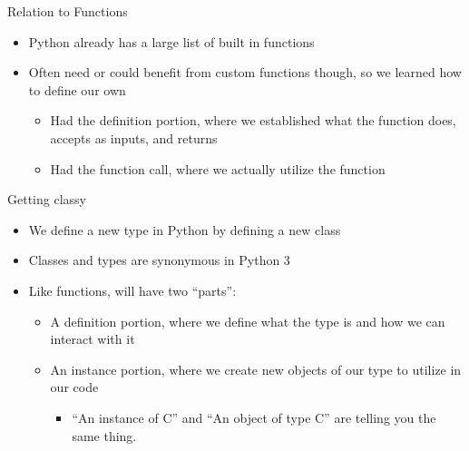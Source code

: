 \documentclass[pdf, aspectratio=169, 12pt]{beamer}
\begin{document}
\begin{frame}{Relation to Functions}
	\begin{itemize}
		\item Python already has a large list of built in functions
		\item Often need or could benefit from custom functions though, so we learned how to define our own
			\begin{itemize}
				\item Had the definition portion, where we established what the function does, accepts as inputs, and returns
				\item Had the function call, where we actually utilize the function
			\end{itemize}
	\end{itemize}
	\vspace{5mm}
	\begin{center}
	\end{center}
\end{frame}

\begin{frame}{Getting classy}
	\begin{itemize}
		\item We define a new \alert{type} in Python by defining a new \alert{class}
		\item Classes and types are synonymous in Python 3
		\item Like functions, will have two ``parts'':
			\begin{itemize}
				\item A definition portion, where we define what the type is and how we can interact with it
				\item An instance portion, where we create new objects of our type to utilize in our code
					\begin{itemize}
						\item ``An instance of C'' and ``An object of type C'' are telling you the same thing.
					\end{itemize}
			\end{itemize}
	\end{itemize}
\end{frame}
\end{document}
